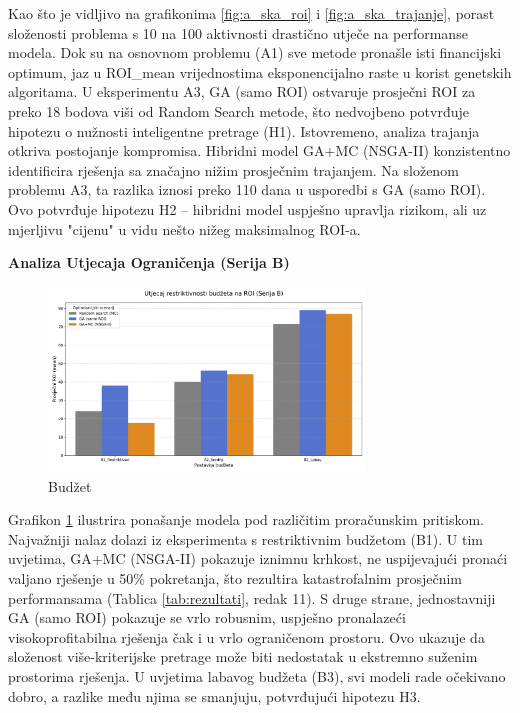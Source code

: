 Kao što je vidljivo na grafikonima \ref{fig:a_ska_roi} i \ref{fig:a_ska_trajanje}, porast složenosti problema s 10 na 100 aktivnosti drastično utječe na performanse modela. Dok su na osnovnom problemu (A1) sve metode pronašle isti financijski optimum, jaz u ROI\_mean vrijednostima eksponencijalno raste u korist genetskih algoritama. U eksperimentu A3, GA (samo ROI) ostvaruje prosječni ROI za preko 18 bodova viši od Random Search metode, što nedvojbeno potvrđuje hipotezu o nužnosti inteligentne pretrage (H1).
Istovremeno, analiza trajanja otkriva postojanje kompromisa. Hibridni model GA+MC (NSGA-II) konzistentno identificira rješenja sa značajno nižim prosječnim trajanjem. Na složenom problemu A3, ta razlika iznosi preko 110 dana u usporedbi s GA (samo ROI). Ovo potvrđuje hipotezu H2 – hibridni model uspješno upravlja rizikom, ali uz mjerljivu "cijenu" u vidu nešto nižeg maksimalnog ROI-a.

\textbf{Analiza Utjecaja Ograničenja (Serija B)}
\begin{figure}[]
    \centering
    \includegraphics[width=0.75\textwidth]{slike/grafikoni_final/B_budzet_roi.png}
    \caption{Budžet}
    \label{fig:budzet_roi}
\end{figure}

Grafikon \ref{fig:budzet_roi} ilustrira ponašanje modela pod različitim proračunskim pritiskom. Najvažniji nalaz dolazi iz eksperimenta s restriktivnim budžetom (B1). U tim uvjetima, GA+MC (NSGA-II) pokazuje iznimnu krhkost, ne uspijevajući pronaći valjano rješenje u 50\% pokretanja, što rezultira katastrofalnim prosječnim performansama (Tablica \ref{tab:rezultati}, redak 11). S druge strane, jednostavniji GA (samo ROI) pokazuje se vrlo robusnim, uspješno pronalazeći visokoprofitabilna rješenja čak i u vrlo ograničenom prostoru. Ovo ukazuje da složenost više-kriterijske pretrage može biti nedostatak u ekstremno suženim prostorima rješenja.
U uvjetima labavog budžeta (B3), svi modeli rade očekivano dobro, a razlike među njima se smanjuju, potvrđujući hipotezu H3.

